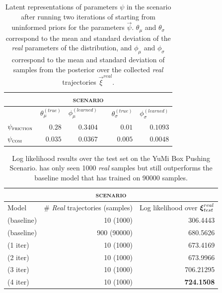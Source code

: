 \begin{table}
\centering
\begin{tabular}{lrrcrr}
\multicolumn{6}{c}{\textsc{\MakeLowercase{\yp{} scenario}}} \\
\toprule
& $\theta_\mu^{(true)}$ & $\phi_\mu^{(learned)}$ && $\theta_\sigma^{(true)}$ & $\phi_\sigma^{(learned)}$ \\
\midrule
$\psi_{\textsc{friction}}$ & $0.28$ & $0.3404$ && $0.01$ & $0.1093$ \\
$\psi_{\textsc{com}}$ & $0.035$ & $ 0.0367$ && $0.005$ & $0.0048$ \\
\bottomrule
\end{tabular}
\caption{Latent representations of parameters $\psi$ in the \yp{} scenario after running two iterations of \dettostoc{} starting from uninformed priors for the parameters $\vec{\psi}$. $\theta_\mu$ and $\theta_\sigma$ correspond to the mean and standard deviation of the \emph{real} parameters of the distribution, and $\phi_\mu$ and $\phi_\sigma$ correspond to the mean and standard deviation of samples from the posterior over the collected \emph{real} trajectories $\vec{\xi}^{real}$. }
\label{table:yumi_parameters}
\end{table}


\begin{table}
\centering
\begin{tabular}{lrr}
\multicolumn{3}{c}{\textsc{\MakeLowercase{\yp{} scenario}}} \\
\toprule
Model & \# \emph{Real} trajectories (samples) & Log likelihood over $\boldsymbol{\xi}^{real}_{test}$ \\
\midrule
\cvae{} (baseline) & 10 (1000) & 306.4443\\
\cvae{} (baseline) & 900 (90000) & 680.5626 \\
\dettostoc{} (1 iter) & 10 (1000) & 673.4169\\
\dettostoc{} (2 iter) & 10 (1000) & 673.9966\\
\dettostoc{} (3 iter) & 10 (1000) & 706.21295\\
\dettostoc{} (4 iter) & 10 (1000) & \textbf{724.1508}\\

\bottomrule
\end{tabular}
\caption{Log likelihood results over the test set on the YuMi Box Pushing Scenario. \dettostoc{} has only seen 1000 \emph{real} samples but still outperforms the baseline model that has trained on 90000 samples.}
\label{table:yumi_results}
\end{table}


